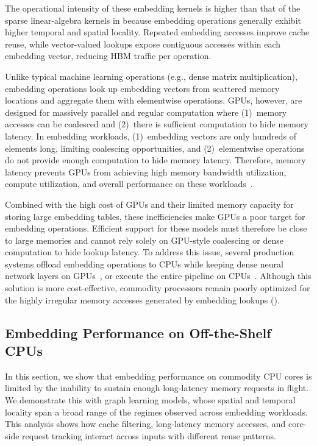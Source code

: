 The operational intensity of these embedding kernels is higher than that of the sparse linear-algebra kernels in  because embedding operations generally exhibit higher temporal and spatial locality. Repeated embedding accesses improve cache reuse, while vector-valued lookups expose contiguous accesses within each embedding vector, reducing HBM traffic per operation.

Unlike typical machine learning operations (e.g., dense matrix multiplication), embedding operations look up embedding vectors from scattered memory locations and aggregate them with elementwise operations. GPUs, however, are designed for massively parallel and regular computation where (1)~memory accesses can be coalesced and (2)~there is sufficient computation to hide memory latency. In embedding workloads, (1)~embedding vectors are only hundreds of elements long, limiting coalescing opportunities, and (2)~elementwise operations do not provide enough computation to hide memory latency. Therefore, memory latency prevents GPUs from achieving high memory bandwidth utilization, compute utilization, and overall performance on these workloads~\cite{pellauer2023symphony}.

Combined with the high cost of GPUs and their limited memory capacity for storing large embedding tables, these inefficiencies make GPUs a poor target for embedding operations. Efficient support for these models must therefore be close to large memories and cannot rely solely on GPU-style coalescing or dense computation to hide lookup latency. To address this issue, several production systems offload embedding operations to CPUs while keeping dense neural network layers on GPUs~\cite{chen2023icde}, or execute the entire pipeline on CPUs~\cite{mudigere2022isca}. Although this solution is more cost-effective, commodity processors remain poorly optimized for the highly irregular memory accesses generated by embedding lookups ().

\subsection{Embedding Performance on Off-the-Shelf CPUs} \label{sec:embedding-performance-cpus} %

In this section, we show that embedding performance on commodity CPU cores is limited by the inability to sustain enough long-latency memory requests in flight. We demonstrate this with graph learning models, whose spatial and temporal locality span a broad range of the regimes observed across embedding workloads. This analysis shows how cache filtering, long-latency memory accesses, and core-side request tracking interact across inputs with different reuse patterns.

